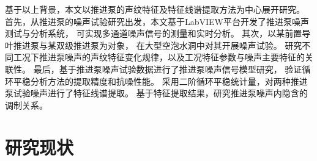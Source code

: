 \begin{comment}
传统的频谱分析方法已经无法准确的对流致激励特征声源进行识别，以及对推进泵的运行状态进行表征。
其噪声信号中存在复杂的干扰因素：其一，推进泵处在复杂的背景环境声场中，
动力系统等辅助结构产生的辐射噪声也给目标声源信号带来了很大干扰，影响
测试系统对推进泵目标真实辐射噪声信号的监测；其二，推进泵结构复杂，
推进泵辐射噪声场同时存在转子旋转声源，以及定子导管结构的静止声源，
其辐射噪声具有分量复杂性。基于上述因素，监测系统接收到的目标声场信号的信噪比较低。特征信
号如流致激励源特征频率、轴频等与其他背景噪声相比均较为微弱，
给基于传统噪声特征提取方法带来了困难，难以准确的识别噪声信号的流致激励源特征。
其次，推进泵噪声存在显著的调制特性，调制现象包含着丰富的流场信息，
但是传统的频谱分析及解调方法无法实现高精度低频调制特征的提取。
因此，开展低信噪比工况下的推进泵噪声信号的低频特征提取技术研究
有重要的理论和工程意义。
\end{comment}

基于以上背景，本文以推进泵的声纹特征及特征线谱提取方法为中心展开研究。
首先，从推进泵的噪声试验研究出发，本文基于LabVIEW平台开发了推进泵噪声测试与分析系统，
可实现多通道噪声信号的测量和实时分析。 
其次，以某前置导叶推进泵与某双级推进泵为对象，
在大型空泡水洞中对其开展噪声试验。
研究不同工况下推进泵噪声的声纹特征变化规律，以及工况特征参数与噪声主要特征的关联性。
最后，基于推进泵噪声试验数据进行了推进泵噪声信号模型研究，
验证循环平稳分析方法的提取精度和抗噪性能。
采用二阶循环平稳统计量，对两种推进泵试验噪声进行了特征线谱提取。
基于特征提取结果，研究推进泵噪声内隐含的调制关系。

\begin{comment}

目前针对推进泵流致激励特性的研究已经开展了大量工作，研究主要集中通过数值模拟获取
压力脉动特性、激振力特性等方面，难以通过试验精确获取流致激励源特征。
其中蕴含着丰富的流致激励
源信息，但是传统的频谱分析及解调方法无法实现高精度低频调制特征的提取。

\end{comment}

\section{研究现状}
